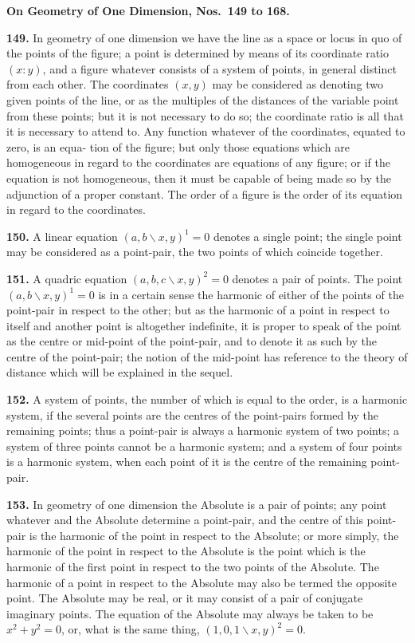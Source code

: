 \documentclass[11pt,a4paper]{book}
\begin{document}
\begin{center}
\medskip
\textbf{On Geometry of One Dimension, Nos.~149 to 168.}

\textbf{149.} In geometry of one dimension we have the line as a space or locus in
quo of the points of the figure; a point is determined by means of its coordinate
ratio $(x:y)$, and a figure whatever consists of a system of points, in general distinct
from each other. The coordinates $(x,y)$ may be considered as denoting two given
points of the line, or as the multiples of the distances of the variable point from these
points; but it is not necessary to do so; the coordinate ratio is all that it is necessary
to attend to. Any function whatever of the coordinates, equated to zero, is an equa-
tion of the figure; but only those equations which are homogeneous in regard to the
coordinates are equations of any figure; or if the equation is not homogeneous, then it
must be capable of being made so by the adjunction of a proper constant. The order
of a figure is the order of its equation in regard to the coordinates.

\textbf{150.} A linear equation $(a,b\!\backslash x,y)^1=0$ denotes a single point; the single point
may be considered as a point-pair, the two points of which coincide together.

\textbf{151.} A quadric equation $(a,b,c\!\backslash x,y)^2=0$ denotes a pair of points. The point
$(a,b\!\backslash x,y)^1=0$ is in a certain sense the harmonic of either of the points of the point-pair
in respect to the other; but as the harmonic of a point in respect to itself and another
point is altogether indefinite, it is proper to speak of the point as the centre or mid-point
of the point-pair, and to denote it as such by the centre of the point-pair; the notion
of the mid-point has reference to the theory of distance which will be explained in the
sequel.

\textbf{152.} A system of points, the number of which is equal to the order, is a harmonic
system, if the several points are the centres of the point-pairs formed by the remaining
points; thus a point-pair is always a harmonic system of two points; a system of
three points cannot be a harmonic system; and a system of four points is a harmonic
system, when each point of it is the centre of the remaining point-pair.

\textbf{153.} In geometry of one dimension the Absolute is a pair of points; any point
whatever and the Absolute determine a point-pair, and the centre of this point-pair is
the harmonic of the point in respect to the Absolute; or more simply, the harmonic of
the point in respect to the Absolute is the point which is the harmonic of the first point
in respect to the two points of the Absolute. The harmonic of a point in respect to the
Absolute may also be termed the opposite point. The Absolute may be real, or it may
consist of a pair of conjugate imaginary points. The equation of the Absolute may
always be taken to be $x^2+y^2=0$, or, what is the same thing, $(1,0,1\!\backslash x,y)^2=0$.


\end{center}
\end{document}
